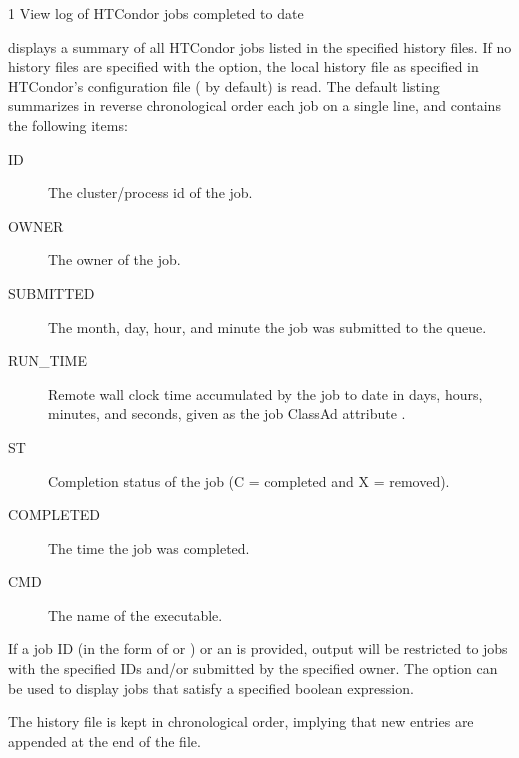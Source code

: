 \begin{ManPage}{\label{man-condor-history}}{1}
{View log of HTCondor jobs completed to date}
\Synopsis
{}


\Description
{} displays a summary of all HTCondor jobs listed in the
specified history files.
If no history files are specified with the  option, 
the local history file as specified in HTCondor's configuration file
( by default) is read.  
The default listing summarizes in reverse chronological order
each job on a single line, and  contains the following items:


\begin{description}
\item[ID] The cluster/process id of the job. 
\item[OWNER] The owner of the job. 
\item[SUBMITTED] The month, day, hour, and minute the job was submitted to the queue. 
\item[RUN\_TIME] Remote wall clock time accumulated by the job to date in days, hours, minutes, and seconds,  given as the job ClassAd attribute
.
\item[ST] Completion status of the job (C = completed and X = removed).
\item[COMPLETED] The time the job was completed.
\item[CMD] The name of the executable. 
\end{description}

If a job ID (in the form of  or ) or an
 is provided, output will be restricted to jobs with the
specified IDs and/or submitted by the specified owner.  
The  option can be used to display jobs that satisfy a
specified boolean expression.

The history file is kept in chronological order,
implying that new entries are appended at the end of the
file.


\end{ManPage}
